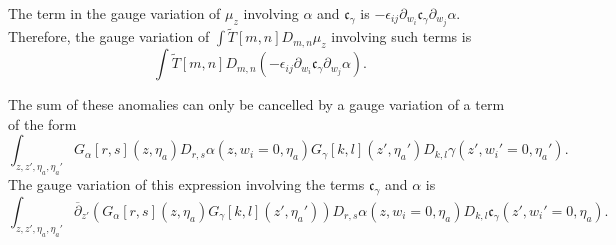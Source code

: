 \documentclass[11pt]{amsart}
\newcommand{\dbar}{\br{\partial}}
\newcommand{\til}{\widetilde}
\newcommand{\br}{\overline}
\newcommand{\mf}{\mathfrak}
\theoremstyle{thm}
\numberwithin{equation}{subsection}
\theoremstyle{def}
\theoremstyle{rem}
\newcommand{\fc}{\mf{c}}
\begin{document}
The term in the gauge variation of $\mu_z$ involving $\alpha$ and $\fc_\gamma$ is $-\epsilon_{ij} \partial_{w_i} \fc_\gamma \partial_{w_j} \alpha.$
Therefore, the gauge variation of $\int \til{T}[m,n] D_{m,n} \mu_z$ involving such terms is
\[
\int \til{T}[m,n] D_{m,n} (- \epsilon_{ij} \partial_{w_i} \fc_\gamma \partial_{w_j} \alpha) .
\]

The sum of these anomalies can only be cancelled by a gauge variation of a term of the form
\[
\int_{z,z',\eta_a,\eta_a'} G_\alpha[r,s] (z,\eta_a) D_{r,s} \alpha(z,w_i=0,\eta_a) G_\gamma[k,l] (z',\eta_a') D_{k,l} \gamma (z',w_i'=0,\eta_a') .
\]
The gauge variation of this expression involving the terms $\fc_\gamma$ and $\alpha$ is
\[
\int_{z,z',\eta_a,\eta_a'} \dbar_{z'} \left(G_\alpha[r,s] (z,\eta_a) G_\gamma[k,l] (z',\eta_a')\right) D_{r,s} \alpha(z,w_i=0,\eta_a) D_{k,l} \fc_\gamma (z',w_i'=0,\eta_a) .
\]
\end{document}
